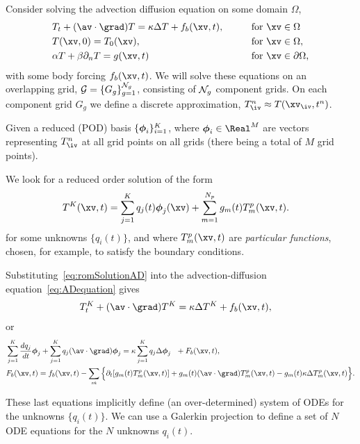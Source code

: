  \label{eq:romAD}

Consider solving the advection diffusion equation on some domain $\Omega$, 
\begin{alignat}{3}
  & T_t + (\av\cdot\grad) T = \kappa \Delta T  + f_b(\xv,t),   \qquad&& \text{for $\xv\in\Omega$} \label{eq:ADequation}\\
  & T(\xv,0)=T_0(\xv),   \qquad&& \text{for $\xv\in\Omega$},\\
  & \alpha T + \beta \partial_n T = g(\xv,t) \qquad&& \text{for $\xv\in\partial\Omega$}, 
\end{alignat}
with some body forcing $f_b(\xv,t)$. 
We will solve these equations on an overlapping grid, ${\mathcal G} =\{ G_g \}_{g=1}^{{\mathcal N}_g}$, consisting of ${\mathcal N}_g$ component
grids. On each component grid $G_g$ we define a discrete approximation, $T_\iv^{n}\approx T(\xv_\iv,t^n)$.

Given a reduced (POD) basis $\{ \boldsymbol{\phi}_i \}_{i=1}^K$, where $\phiv_i \in\Real^M$ are vectors
representing $T_\iv^n$ at all grid points on all grids (there being a total of $M$ grid points). 

We look for a reduced order solution of the form
\begin{align}
   T^K(\xv,t) &=  \sum_{j=1}^K q_j(t)\phiv_j(\xv)  + \sum_{m=1}^{N_p} g_m(t)T^p_m(\xv,t)   . \label{eq:romSolutionAD}
\end{align}
for some unknowns $\{ q_i(t) \}$, and where $T_m^p(\xv,t)$ are {\em particular functions}, chosen, for example, to satisfy the boundary conditions.

Substituting~\eqref{eq:romSolutionAD} into the advection-diffusion equation~\eqref{eq:ADequation} gives
\begin{align}
  & T^K_t + (\av\cdot\grad)T^K = \kappa \Delta T^K + f_b(\xv,t),  \label{eq:romEquationAD} 
\end{align}
or
\begin{align}
  & \sum_{j=1}^K \frac{d q_j}{dt} \phiv_j  + \sum_{j=1}^K q_j (\av\cdot\grad)\phiv_j 
             = \kappa \sum_{j=1}^K q_j \Delta \phiv_j ~~ + F_b(\xv,t),  \\
  &  F_b(\xv,t)   = f_b(\xv,t) 
        -  \sum_m \Big\{ \partial_t[ g_m(t)T^p_m(\xv,t)] + g_m(t) (\av\cdot\grad)T^p_m(\xv,t) - g_m(t)\kappa \Delta T^p_m(\xv,t) \Big\}.
\end{align}

These last equations implicitly define (an over-determined) system of ODEs for the unknowns $\{ q_i(t) \}$. 
We can use a Galerkin projection to define a set of $N$ ODE equations for the $N$ unknowns $q_i(t)$. 

